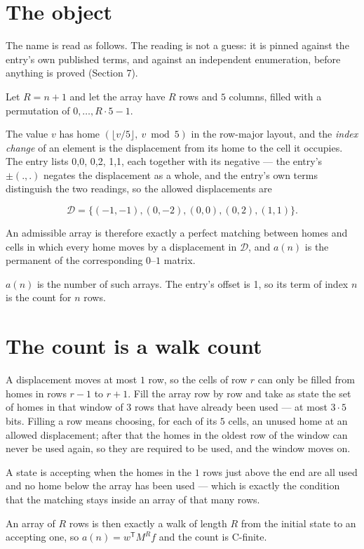 \documentclass[11pt]{article}
\theoremstyle{definition}
\begin{document}
\section{The object}

The name is read as follows. The reading is not a guess: it is pinned against the entry's own published terms, and against an independent enumeration, before anything is proved (Section 7).

Let $R = n + 1$ and let the array have $R$ rows and $5$ columns, filled with a permutation of $0,\dots,R\cdot5-1$.

The value $v$ has home $(\lfloor v/5\rfloor,\ v \bmod 5)$ in the row-major layout, and the {\itshape index change} of an element is the displacement from its home to the cell it occupies. The entry lists 0,0, 0,2, 1,1, each together with its negative --- the entry's $\pm(.,.)$ negates the displacement as a whole, and the entry's own terms distinguish the two readings, so the allowed displacements are

\[\mathcal{D} = \{(-1,-1), (0,-2), (0,0), (0,2), (1,1)\}.\]

An admissible array is therefore exactly a perfect matching between homes and cells in which every home moves by a displacement in $\mathcal{D}$, and $a(n)$ is the permanent of the corresponding $0$--$1$ matrix.

$a(n)$ is the number of such arrays. The entry's offset is 1, so its term of index $n$ is the count for $n$ rows.

\section{The count is a walk count}

A displacement moves at most $1$ row, so the cells of row $r$ can only be filled from homes in rows $r-1$ to $r+1$. Fill the array row by row and take as state the set of homes in that window of $3$ rows that have already been used --- at most $3\cdot5$ bits. Filling a row means choosing, for each of its $5$ cells, an unused home at an allowed displacement; after that the homes in the oldest row of the window can never be used again, so they are required to be used, and the window moves on.

A state is accepting when the homes in the $1$ rows just above the end are all used and no home below the array has been used --- which is exactly the condition that the matching stays inside an array of that many rows.

An array of $R$ rows is then exactly a walk of length $R$ from the initial state to an accepting one, so $a(n) = w^{\mathsf T}M^{R}f$ and the count is C-finite.
\end{document}
